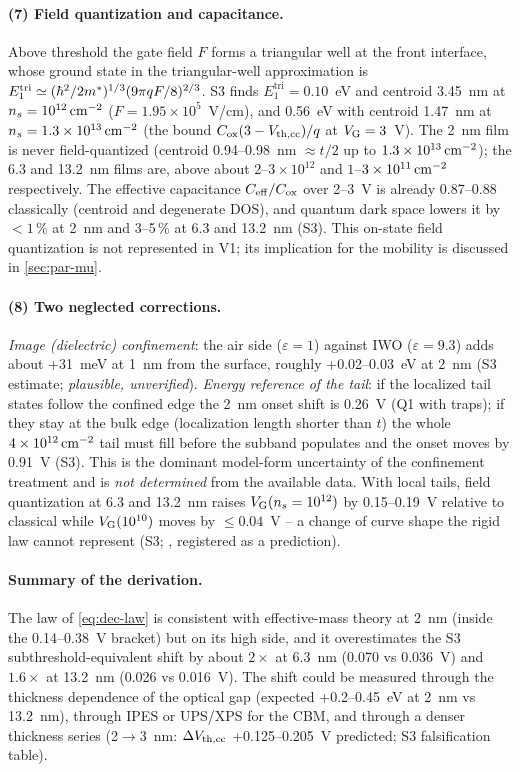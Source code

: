 \paragraph{(7) Field quantization and capacitance.}
Above threshold the gate field $F$ forms a triangular well at the front interface, whose ground state in the
triangular-well approximation is $E_1^{\mathrm{tri}} \simeq (\hbar^2/2m^{*})^{1/3}(9\pi qF/8)^{2/3}$. S3 finds
$E_1^{\mathrm{tri}} = 0.10$~eV and centroid 3.45~nm at $n_s = 10^{12}\,\mathrm{cm}^{-2}$ ($F = 1.95\times10^5$~V/cm), and
0.56~eV with centroid 1.47~nm at $n_s = 1.3\times10^{13}\,\mathrm{cm}^{-2}$ (the bound $C_{\mathrm{ox}}(3-V_{\mathrm{th,cc}})/q$ at $V_{\mathrm{G}} = 3$~V). The
2~nm film is never field-quantized (centroid 0.94--0.98~nm $\approx t/2$ up to $1.3\times10^{13}\,\mathrm{cm}^{-2}$); the 6.3 and
13.2~nm films are, above about $2$--$3\times10^{12}$ and $1$--$3\times10^{11}\,\mathrm{cm}^{-2}$ respectively. The effective
capacitance $C_{\mathrm{eff}}/C_{\mathrm{ox}}$ over 2--3~V is already 0.87--0.88 classically (centroid and degenerate DOS),
and quantum dark space lowers it by $<1$\,\% at 2~nm and 3--5\,\% at 6.3 and 13.2~nm (S3). This on-state
field quantization is not represented in V1; its implication for the mobility is discussed in
\cref{sec:par-mu}.

\paragraph{(8) Two neglected corrections.}
\emph{Image (dielectric) confinement}: the air side ($\varepsilon = 1$) against IWO ($\varepsilon = 9.3$) adds
about +31~meV at 1~nm from the surface, roughly +0.02--0.03~eV at 2~nm (S3 estimate; \emph{plausible,
unverified}). \emph{Energy reference of the tail}: if the localized tail states follow the confined edge the
2~nm onset shift is 0.26~V (Q1 with traps); if they stay at the bulk edge (localization length shorter than $t$)
the whole $4\times10^{12}\,\mathrm{cm}^{-2}$ tail must fill before the subband populates and the onset moves by 0.91~V (S3).
This is the dominant model-form uncertainty of the confinement treatment and is \emph{not determined} from the
available data. With local tails, field quantization at 6.3 and 13.2~nm raises $V_{\mathrm{G}}(n_s = 10^{12})$ by
0.15--0.19~V relative to classical while $V_{\mathrm{G}}(10^{10})$ moves by $\le 0.04$~V -- a change of curve shape the rigid
law cannot represent (S3; \evSURR, registered as a prediction).

\paragraph{Summary of the derivation.}
The law of \cref{eq:dec-law} is consistent with effective-mass theory at 2~nm (inside the 0.14--0.38~V bracket)
but on its high side, and it overestimates the S3 subthreshold-equivalent shift by about $2\times$ at 6.3~nm (0.070 vs 0.036~V) and $1.6\times$ at
13.2~nm (0.026 vs 0.016~V). The shift could be measured through the thickness dependence of the optical gap
(expected +0.2--0.45~eV at 2~nm vs 13.2~nm), through IPES or UPS/XPS for the CBM, and through a denser thickness series
(2$\rightarrow$3~nm: $\Delta V_{\mathrm{th,cc}}$ +0.125--0.205~V predicted; S3 falsification table).

